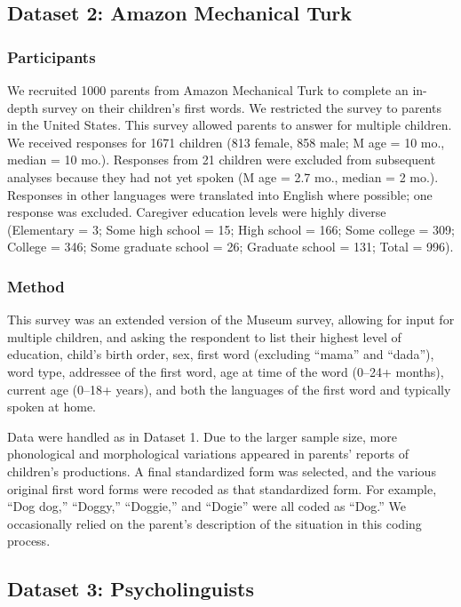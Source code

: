\documentclass[10pt,letterpaper]{article}
\begin{document}
\subsection{Dataset 2: Amazon Mechanical Turk}

\subsubsection{Participants}

We recruited 1000 parents from Amazon Mechanical Turk to complete an in-depth survey on their children's first words. We restricted the survey to parents in the United States. This survey allowed parents to answer for multiple children. We received responses for 1671 children (813 female, 858 male; M age = 10 mo., median = 10 mo.). Responses from 21 children were excluded from subsequent analyses because they had not yet spoken (M age = 2.7 mo., median = 2 mo.). Responses in other languages were translated into English where possible; one response was excluded. Caregiver education levels were highly diverse (Elementary = 3; Some high school = 15; High school = 166; Some college = 309; College = 346; Some graduate school = 26; Graduate school = 131; Total = 996).

\subsubsection{Method}

This survey was an extended version of the Museum survey, allowing for input for multiple children, and asking the respondent to list their highest level of education, child's birth order, sex, first word (excluding ``mama'' and ``dada''), word type, addressee of the first word, age at time of the word (0--24+ months), current age (0--18+ years), and both the languages of the first word and typically spoken at home.

Data were handled as in Dataset 1. Due to the larger sample size, more phonological and morphological variations appeared in parents' reports of children's productions. A final standardized form was selected, and the various original first word forms were recoded as that standardized form. For example, ``Dog dog,'' ``Doggy,'' ``Doggie,'' and ``Dogie'' were all coded as ``Dog.'' We occasionally relied on the parent's description of the situation in this coding process.

\subsection{Dataset 3: Psycholinguists }
\end{document}
